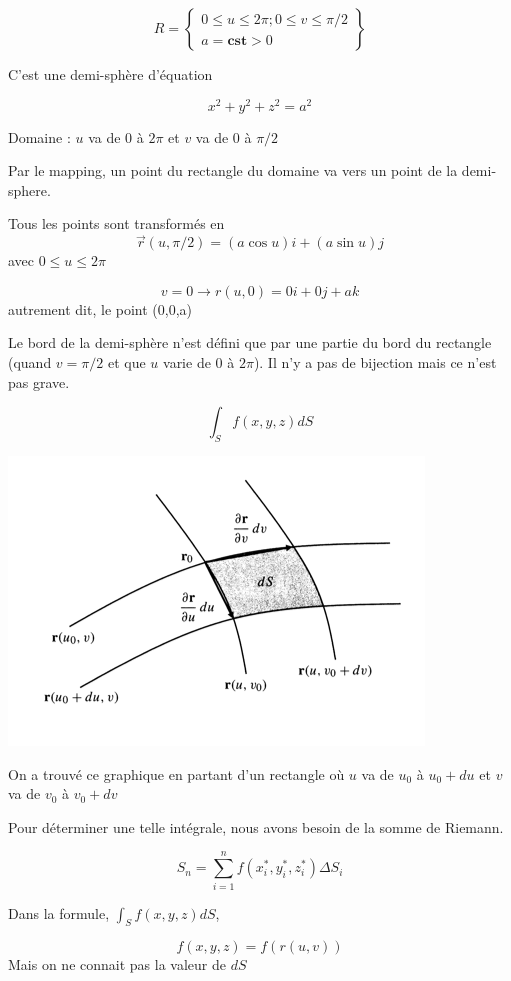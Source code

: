 $$
R=
\left\{
\begin{array}{c}
0\leqslant u \leqslant 2 \pi ; 0\leqslant v\leqslant \pi /2\\

a = \textbf{cst} > 0
\end{array}
\right\}
$$

C'est une demi-sphère d'équation

\[x^2+y^2+z^2 = a^2\]

Domaine :
$u$ va de $0$ à $2\pi$ et $v$ va de 0 à $\pi /2$

Par le mapping, un point du rectangle du domaine va vers un point de la demi-sphere.

Tous les points sont transformés en \[\vec r (u,\pi/2 ) = (a \cos u  )i + (a \sin u ) j \] avec $0\leqslant u \leqslant 2 \pi $

\[v=0 \to r(u,0) = 0 i + 0 j + a k\] autrement dit, le point (0,0,a)


Le bord de la demi-sphère n'est défini que par une partie du bord du rectangle (quand $v=\pi/2$ et que $u$ varie de $0$ à $2\pi$).
Il n'y a pas de bijection mais ce n'est pas grave.


\[\int_S f(x,y,z)dS\]

\includegraphics[scale=0.5]{courbe2.png}

On a trouvé ce graphique en partant d'un rectangle où $u$ va de $u_0$ à $u_0 + du$ et $v$ va de $v_0$ à $v_0+dv$

Pour déterminer une telle intégrale, nous avons besoin de la somme de Riemann.

\[S_n = \sum_{i=1}^nf(x_i^*,y_i^*,z_i^*) \Delta S_i\]

Dans la formule, $\int_S f(x,y,z)dS$,

\[f(x,y,z)=f(r(u,v))\] Mais on ne connait pas la valeur de $dS$

